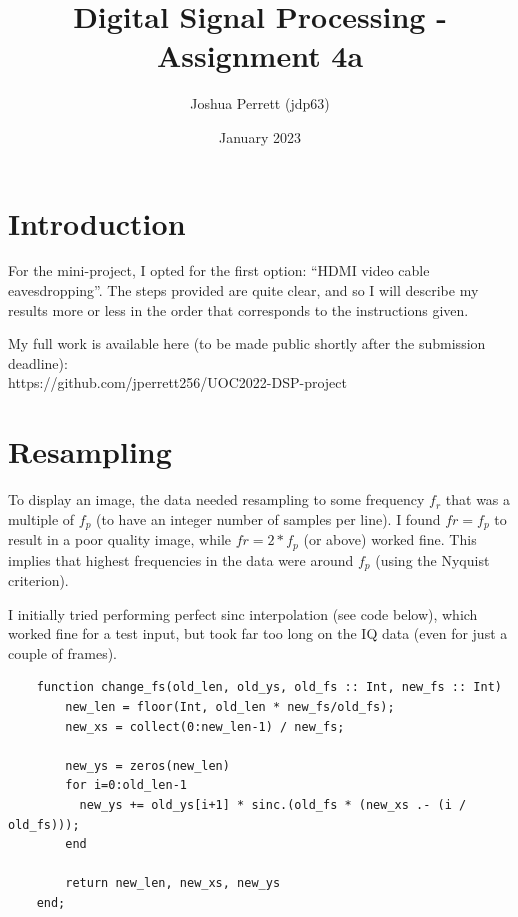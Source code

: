 \documentclass{article}
\title{Digital Signal Processing - Assignment 4a}
\author{Joshua Perrett (jdp63)}
\date{January 2023}
\begin{document}
\maketitle

\section*{Introduction}

For the mini-project, I opted for the first option: ``HDMI video cable eavesdropping''. The steps provided are quite clear, and so I will describe my results more or less in the order that corresponds to the instructions given.

My full work is available here (to be made public shortly after the submission deadline): \\ https://github.com/jperrett256/UOC2022-DSP-project



\section*{Resampling}

To display an image, the data needed resampling to some frequency $f_r$ that was a multiple of $f_p$ (to have an integer number of samples per line). I found $fr = f_p$ to result in a poor quality image, while $fr = 2 * f_p$ (or above) worked fine. This implies that highest frequencies in the data were around $f_p$ (using the Nyquist criterion).

I initially tried performing perfect sinc interpolation (see code below), which worked fine for a test input, but took far too long on the IQ data (even for just a couple of frames).

\begin{verbatim}
    function change_fs(old_len, old_ys, old_fs :: Int, new_fs :: Int)
        new_len = floor(Int, old_len * new_fs/old_fs);
        new_xs = collect(0:new_len-1) / new_fs;

        new_ys = zeros(new_len)
        for i=0:old_len-1
          new_ys += old_ys[i+1] * sinc.(old_fs * (new_xs .- (i / old_fs)));
        end

        return new_len, new_xs, new_ys
    end;
\end{verbatim}
\end{document}
